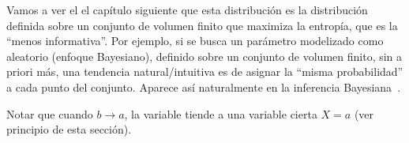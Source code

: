 Vamos  a  ver  el  el   cap\'itulo  siguiente  que  esta  distribuci\'on  es  la
distribuci\'on  definida sobre  un conjunto  de volumen  finito que  maximiza la
entrop\'ia, \ie  que es la  ``menos informativa''. Por  ejemplo, si se  busca un
par\'ametro  modelizado como  aleatorio (enfoque  Bayesiano), definido  sobre un
conjunto de volumen finito, sin  a priori m\'as, una tendencia natural/intuitiva
es de asignar la ``misma probabilidad'' a cada punto del conjunto. Aparece as\'i
naturalmente en la inferencia Bayesiana~\cite{Rob07}.
 
Notar que  cuando $b \to a$,  la variable tiende a  una variable cierta  $X = a$
(ver principio de esta secci\'on).
